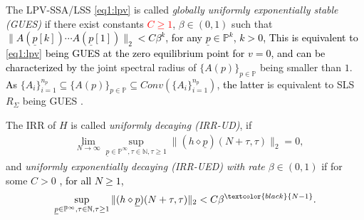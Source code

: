 \documentclass[journal,twoside,web]{ieeecolor}
\begin{document}
  The LPV-SSA/LSS  \eqref{eq1:lpv} is called \emph{globally uniformly exponentially stable (GUES)} if there exist constants \textcolor{red}{$C \ge 1$}, $\beta \in (0,1)$ such that 
  \textcolor{black}
  {\(
  \|A(\underline{p}[k]) \cdots A(\underline{p}[1])\|_2 < C \beta^k
  \),
  for any  $\underline{p} \in \mathbb{P}^k$, $k >0$, 
  This is equivalent to \eqref{eq1:lpv} %
  being GUES at the zero equilibrium point for $v=0$, 
  and can be characterized by}
  the joint spectral radius of $\{A(p)\}_{p \in \mathbb{P}}$ being smaller than $1$. \textcolor{black}{As} $\{A_i\}_{i=1}^{n_p} \subseteq \{A(p)\}_{p \in \mathbb{P}} \subseteq Conv(\{A_i\}_{i=1}^{n_p})$, \textcolor{black}{the latter} is equivalent to SLS $R_{\Sigma}$ being GUES \cite{RJungers}.

    
  The IRR of $H$ is called
  \emph{uniformly decaying (IRR-UD)}, if 
   \begin{align*}
   & \lim_{N \rightarrow \infty} \sup_{\underline{p} \in \mathbb{P}^{\infty}, \tau \in \mathbb{N},\tau \ge 1}\|(h \diamond \underline{p})(N+\tau,\tau)\|_2=0, 
   \end{align*}
  and \emph{uniformly exponentially decaying (IRR-UED) with rate $\beta \in (0,1)$} if 
  for some $C > 0$ \textcolor{black}{, for all $N \ge 1$,} %
  \begin{align*}
   \sup_{\underline{p} \in \mathbb{P}^{\infty}, \tau \in \mathbb{N}, \tau \ge 1} \|(h \diamond \underline{p})(N+\tau,\tau)\|_2 < C\beta^{\textcolor{black}{N-1}}.
   \end{align*}
  
\end{document}
